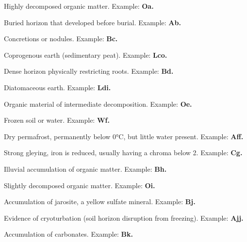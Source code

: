 \documentclass[12pt]{exam}
\begin{document}
\begin{description}[labelsep=1.80em, align=right]
\item[a]
Highly decomposed organic matter. Example: \textbf{Oa.}
\vspace{0.1in}
\item[b]
Buried horizon that developed before burial. Example: \textbf{Ab.}
\vspace{0.1in}
\item[c]
Concretions or nodules. Example: \textbf{Bc.}
\vspace{0.1in}
\item[co]
Coprogenous earth (sedimentary peat). Example: \textbf{Lco.}
\vspace{0.1in}
\item[d]
Dense horizon physically restricting roots. Example: \textbf{Bd.}
\vspace{0.1in}
\item[di]
Diatomaceous earth. Example: \textbf{Ldi.}
\vspace{0.1in}
\item[e]
Organic material of intermediate decomposition. Example: \textbf{Oe.}
\vspace{0.1in}
\item[f]
Frozen soil or water. Example: \textbf{Wf.}
\vspace{0.1in}
\item[ff]
Dry permafrost, permanently below 0°C, but little water present. Example: \textbf{Aff.}
\vspace{0.1in}
\item[g]
Strong gleying, iron is reduced, usually having a chroma below 2. Example: \textbf{Cg.}
\vspace{0.1in}
\item[h]
Illuvial accumulation of organic matter. Example: \textbf{Bh.}
\vspace{0.1in}
\item[i]
Slightly decomposed organic matter. Example: \textbf{Oi.}
\vspace{0.1in}
\item[j]
Accumulation of jarosite, a yellow sulfate mineral. Example: \textbf{Bj.}
\vspace{0.1in}
\item[jj]
Evidence of cryoturbation (soil horizon disruption from freezing). Example: \textbf{Ajj.}
\vspace{0.1in}
\item[k]
Accumulation of carbonates. Example: \textbf{Bk.}
\vspace{0.1in}

\end{description}
\end{document}
